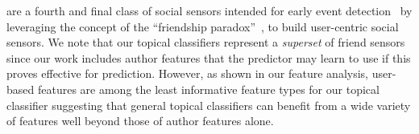 \vspace{2mm}
are a fourth and final class of social sensors intended for early
event detection~\cite{sandy,garcia} by leveraging the concept of the
``friendship paradox''~\cite{feld}, %
to build user-centric social sensors.  We note that our topical classifiers 
represent a \emph{superset} of friend sensors since our work
includes author features that the predictor may learn to use if this
proves effective for prediction.  However, as shown in our feature
analysis, user-based features are among the least informative feature
types for our topical classifier suggesting that general topical 
classifiers can benefit from a wide variety of features well beyond those of
author features alone.






%

